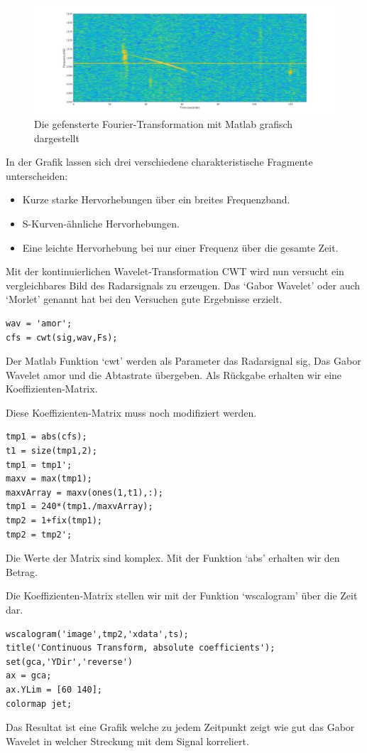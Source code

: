 \begin{refsection}
\begin{figure}
	\centering
	\includegraphics[width=0.7\linewidth]{papers/meteor/images/signal_gfft.png}
	\caption{Die gefensterte Fourier-Transformation mit Matlab grafisch dargestellt}
	\label{fig:signalmitgfft}
\end{figure}
In der Grafik lassen sich drei verschiedene charakteristische Fragmente unterscheiden:
\begin{itemize}
	\item Kurze starke Hervorhebungen über ein breites Frequenzband.
	\item S-Kurven-ähnliche  Hervorhebungen.
	\item Eine leichte Hervorhebung bei nur einer Frequenz über die gesamte Zeit.
\end{itemize}
 
Mit der kontinuierlichen Wavelet-Transformation CWT wird nun versucht ein vergleichbares Bild des Radarsignals zu erzeugen.
Das `Gabor Wavelet' oder auch `Morlet' genannt hat bei den Versuchen gute Ergebnisse erzielt.
\begin{lstlisting}
wav = 'amor';
cfs = cwt(sig,wav,Fs);
\end{lstlisting}
Der Matlab Funktion `cwt' werden als Parameter das Radarsignal sig, Das Gabor Wavelet amor und die Abtastrate übergeben.
Als Rückgabe erhalten wir eine Koeffizienten-Matrix.

Diese Koeffizienten-Matrix muss noch modifiziert werden.
\begin{lstlisting}
tmp1 = abs(cfs);
t1 = size(tmp1,2);
tmp1 = tmp1';
maxv = max(tmp1);
maxvArray = maxv(ones(1,t1),:);
tmp1 = 240*(tmp1./maxvArray);
tmp2 = 1+fix(tmp1);
tmp2 = tmp2';
\end{lstlisting}
Die Werte der Matrix sind komplex.
Mit der Funktion `abs' erhalten wir den Betrag.

Die Koeffizienten-Matrix stellen wir mit der Funktion `wscalogram' über die Zeit dar.
\begin{lstlisting}
wscalogram('image',tmp2,'xdata',ts);
title('Continuous Transform, absolute coefficients');
set(gca,'YDir','reverse')
ax = gca;
ax.YLim = [60 140];
colormap jet;
\end{lstlisting}
Das Resultat ist eine Grafik welche zu jedem Zeitpunkt zeigt wie gut das Gabor Wavelet in welcher Streckung mit dem Signal korreliert. 


\end{refsection}
